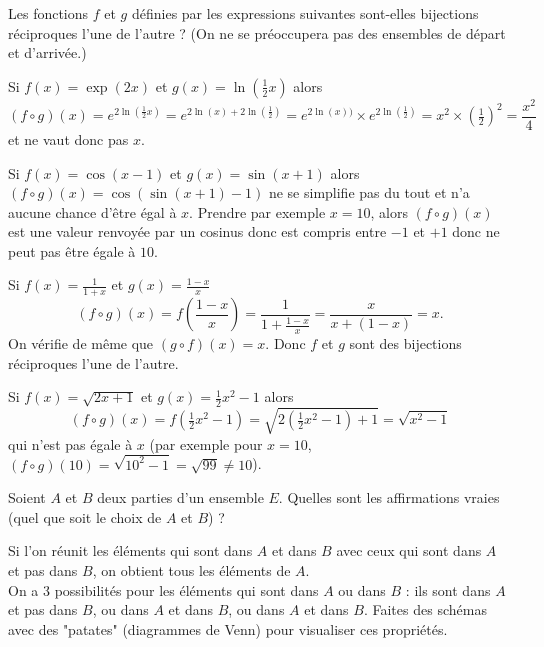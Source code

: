 \begin{question}
Les fonctions $f$ et $g$ définies par les expressions suivantes sont-elles bijections réciproques l'une de l'autre ?
(On ne se préoccupera pas des ensembles de départ et d'arrivée.)
\begin{answers} 
\end{answers}
\begin{explanations}
Si $f(x) = \exp(2x)$ et $g(x) = \ln(\tfrac12x)$ alors 
$$(f \circ g)(x) 
= e^{2 \ln(\tfrac12x) }
= e^{2 \ln(x) + 2\ln(\tfrac12) }
= e^{2 \ln(x))}\times e^{2\ln(\tfrac12) }
= x^2 \times (\tfrac12)^2 = \frac{x^2}{4}$$
et ne vaut donc pas $x$.

Si $f(x) = \cos(x-1)$ et $g(x) = \sin(x+1)$ alors $(f \circ g)(x) = \cos( \sin(x+1) -1)$ ne se simplifie pas du tout et n'a aucune chance d'être égal à $x$. Prendre par exemple $x=10$, alors $(f \circ g)(x)$ est une valeur renvoyée par un cosinus donc est compris entre $-1$ et $+1$ donc ne peut pas être égale à $10$.

Si $f(x) = \frac{1}{1+x}$ et $g(x) = \frac{1-x}{x}$
$$(f \circ g)(x) 
= f\left(\frac{1-x}{x} \right)
=  \frac{1}{1+\frac{1-x}{x}}
= \frac{x}{x+(1-x)} = x.$$
On vérifie de même que $(g \circ f)(x) = x$. Donc $f$ et $g$ sont des bijections réciproques l'une de l'autre.

Si $f(x)= \sqrt{2x+1}$ et $g(x) = \frac12x^2-1$ alors
$$(f \circ g)(x)
= f\left(\tfrac12x^2-1  \right)
= \sqrt{ 2(\tfrac12x^2-1)+1 }
= \sqrt{ x^2-1}$$
qui n'est pas égale à $x$ (par exemple pour $x=10$, $(f\circ g)(10)= \sqrt{10^2-1}=\sqrt{99} \neq 10$).
\end{explanations}
\end{question}


\begin{question}
Soient $A$ et $B$ deux parties d'un ensemble $E$.
Quelles sont les affirmations vraies (quel que soit le choix de $A$ et $B$) ?
\begin{answers}
\end{answers}
\begin{explanations} 
Si l'on réunit les éléments qui sont dans $A$ et dans $B$ avec ceux qui sont dans $A$ et pas dans $B$, on obtient tous les éléments de $A$.\\
On a 3 possibilités pour les éléments qui sont dans $A$ ou dans $B$ : ils sont dans $A$ et pas dans $B$, ou dans $A$ et dans $B$, ou dans $A$ et dans $B$.
Faites des schémas avec des "patates" (diagrammes de Venn) pour visualiser ces propriétés.
\end{explanations}
\end{question}


